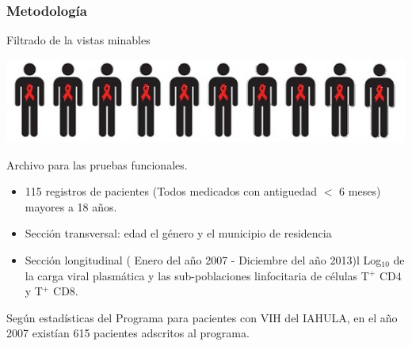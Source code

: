 \documentclass{beamer}%
\begin{document}
\begin{frame}
\frametitle{\textbf\textbf{Metodolog\'ia}}
\begin{block}{Filtrado de la vistas minables}
\end{block}
\begin{center}\includegraphics[height=0.1\textheight]{MU.jpg}\end{center}
\small{Archivo para las pruebas funcionales.}
	
\tiny{
\begin{itemize}
 \item 115 registros de pacientes (Todos medicados con antiguedad $<$ 6 meses) mayores a 18 a\~nos.
 \item Secci\'on transversal: edad el g\'enero y el municipio de residencia  
 \item Secci\'on longitudinal ( Enero del año 2007 - Diciembre del año 2013)l Log$_{10}$ de la carga viral plasm\'atica y las sub-poblaciones linfocitaria de c\'elulas T$^{+}$ CD4 y  T$^{+}$ CD8.
\end{itemize}
}
\tiny{Seg\'un estad\'isticas del Programa para pacientes con VIH del IAHULA, en el año 2007 exist\'ian 615 pacientes adscritos al programa.} 
\end{frame}
\end{document}
